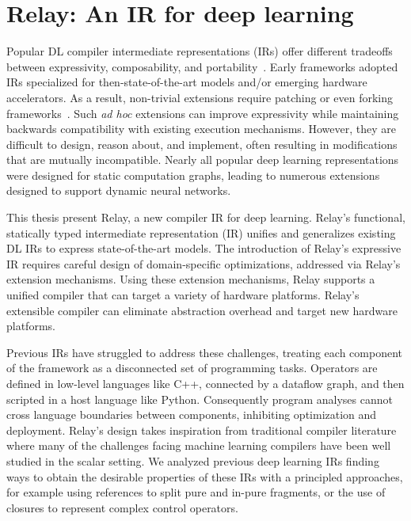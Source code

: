 \chapter{Relay: An IR for deep learning}
\label{ch:relay}

Popular DL compiler intermediate representations (IRs) offer different tradeoffs
between expressivity, composability, and portability~\citep{
  tensorflow, pytorch_ad, chainer_learningsys2015, tangent, theano, glow}.
Early frameworks adopted IRs
  specialized for then-state-of-the-art models and/or
  emerging hardware accelerators.
As a result, non-trivial extensions require
  patching or even forking frameworks~\citep{
    tf_fold, tf_lite, tangent, tf_eager, xla, glow, torchscript}.
Such \textit{ad hoc} extensions can improve expressivity
  while maintaining backwards compatibility with existing execution mechanisms.
However, they are difficult to design, reason about, and implement,
  often resulting in modifications that are mutually incompatible.
Nearly all popular deep learning representations were designed for
  static computation graphs, leading to numerous
  extensions designed to support dynamic neural networks.

This thesis present Relay,
  a new compiler IR for deep learning.
Relay's functional, statically typed intermediate representation (IR)
  unifies and generalizes existing DL IRs
  to express state-of-the-art models.
The introduction of Relay's expressive IR requires
  careful design of domain-specific optimizations,
  addressed via Relay's extension mechanisms.
Using these extension mechanisms,
  Relay supports a unified compiler that
  can target a variety of hardware platforms.
Relay's extensible compiler
   can eliminate abstraction overhead and
   target new hardware platforms.

Previous IRs have struggled to address these challenges, treating each
  component of the framework as a disconnected set of programming tasks.
Operators are defined in low-level languages like C++,
  connected by a dataflow graph, and then scripted
  in a host language like Python.
Consequently
  program analyses cannot cross language boundaries between components,
  inhibiting optimization and deployment.
Relay's design takes inspiration from traditional
  compiler literature where many of the challenges facing
  machine learning compilers have been well studied in the scalar setting.
We analyzed previous deep learning IRs finding ways
  to obtain the desirable properties of these IRs
  with a principled approaches, for example using references
  to split pure and in-pure fragments, or the use of closures
  to represent complex control operators.

